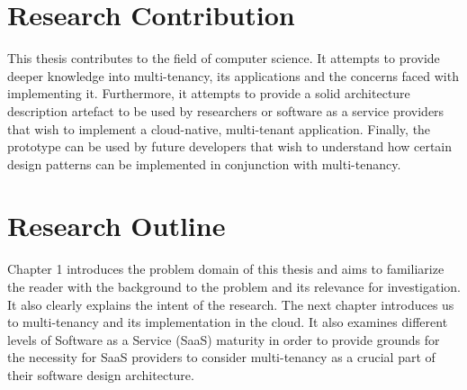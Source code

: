 \section{Research Contribution}
This thesis contributes to the field of computer science. It attempts to provide deeper knowledge into multi-tenancy, its applications and the concerns faced with implementing it. Furthermore, it attempts to provide a solid architecture description artefact to be used by researchers or software as a service providers that wish to implement a cloud-native, multi-tenant application. Finally, the prototype can be used by future developers that wish to understand how certain design patterns can be implemented in conjunction with multi-tenancy. 


\section{Research Outline}

Chapter 1 introduces the problem domain of this thesis and aims to familiarize the reader with the background to the problem and its relevance for investigation. It also clearly explains the intent of the research. The next chapter introduces us to multi-tenancy and its implementation in the cloud. It also examines different levels of Software as a Service (SaaS) maturity in order to provide grounds for the necessity for SaaS providers to consider multi-tenancy as a crucial part of their software design architecture.